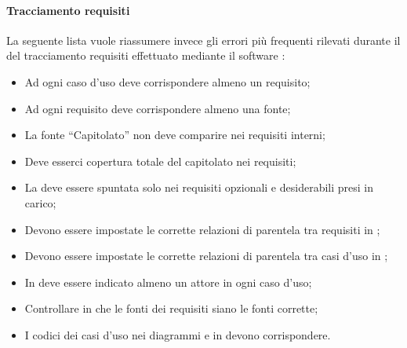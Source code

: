 \documentclass[12pt,a4paper]{article}
\begin{document}
\paragraph{Tracciamento requisiti}
La seguente lista vuole riassumere invece gli  errori più frequenti rilevati durante il  del tracciamento requisiti effettuato mediante il software :
\begin{itemize}
	\item Ad ogni caso d’uso deve corrispondere almeno un requisito;
	\item Ad ogni requisito deve corrispondere almeno una fonte; 
	\item La fonte “Capitolato” non deve comparire nei requisiti interni; 
	\item Deve esserci copertura totale del capitolato nei requisiti;
	\item La   deve essere spuntata solo nei requisiti opzionali e desiderabili presi in carico;
	\item Devono essere impostate le corrette relazioni di parentela tra requisiti in ; 
	\item Devono essere impostate le corrette relazioni di parentela tra casi d’uso in ; 
	\item In  deve essere indicato almeno un attore in ogni caso d’uso; 
	\item Controllare in  che le fonti dei requisiti siano le fonti corrette; 
	\item I codici dei casi d’uso nei diagrammi e in  devono corrispondere.
\end{itemize}


\newpage
\printglossary[title={Glossario}]
\end{document}
